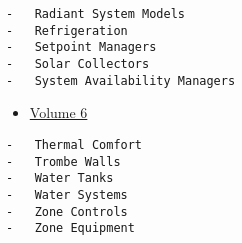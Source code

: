 \begin{lstlisting}
-   Radiant System Models
-   Refrigeration
-   Setpoint Managers
-   Solar Collectors
-   System Availability Managers
\end{lstlisting}

\begin{itemize}
\tightlist
\item
  \href{13f-EncyclopaedicRefs.md}{Volume 6}
\end{itemize}

\begin{lstlisting}
-   Thermal Comfort
-   Trombe Walls
-   Water Tanks
-   Water Systems
-   Zone Controls
-   Zone Equipment
\end{lstlisting}
